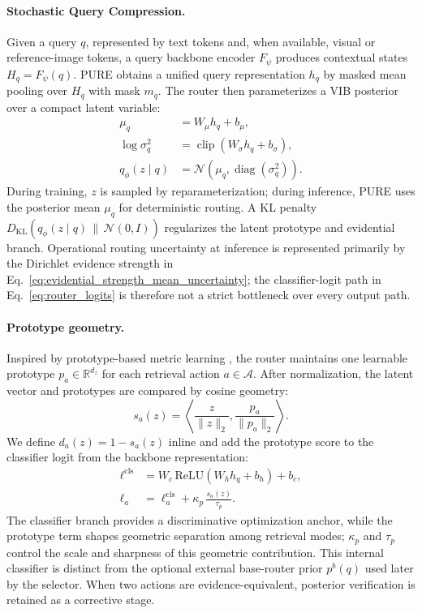 \documentclass[a4paper,fleqn]{cas-dc}
\begin{document}
\paragraph{Stochastic Query Compression.}
Given a query $q$, represented by text tokens and, when available, visual or reference-image tokens, a query backbone encoder $F_{\psi}$ produces contextual states $H_q=F_{\psi}(q)$. PURE obtains a unified query representation $h_q$ by masked mean pooling over $H_q$ with mask $m_q$. The router then parameterizes a VIB posterior over a compact latent variable:
\begin{equation}
\label{eq:vib_encoder}
\begin{aligned}
\mu_q&=W_{\mu}h_q+b_{\mu},\\
\log\sigma_q^2&=\operatorname{clip}(W_{\sigma}h_q+b_{\sigma}),\\
q_{\phi}(z\mid q)&=\mathcal{N}(\mu_q,\operatorname{diag}(\sigma_q^2)).
\end{aligned}
\end{equation}
During training, $z$ is sampled by reparameterization; during inference, PURE uses the posterior mean $\mu_q$ for deterministic routing. A KL penalty $D_{\mathrm{KL}}(q_{\phi}(z\mid q)\,\|\,\mathcal{N}(0,I))$ regularizes the latent prototype and evidential branch. Operational routing uncertainty at inference is represented primarily by the Dirichlet evidence strength in Eq.~\eqref{eq:evidential_strength_mean_uncertainty}; the classifier-logit path in Eq.~\eqref{eq:router_logits} is therefore not a strict bottleneck over every output path.

\paragraph{Prototype geometry.}
Inspired by prototype-based metric learning \citep{Snell2017Prototypical}, the router maintains one learnable prototype $p_a\in\mathbb{R}^{d_z}$ for each retrieval action $a\in\mathcal{A}$. After normalization, the latent vector and prototypes are compared by cosine geometry:
\begin{equation}
\label{eq:prototype_geometry}
s_a(z)=
\left\langle
\frac{z}{\|z\|_2},
\frac{p_a}{\|p_a\|_2}
\right\rangle.
\end{equation}
We define $d_a(z)=1-s_a(z)$ inline and add the prototype score to the classifier logit from the backbone representation:
\begin{equation}
\label{eq:router_logits}
\begin{aligned}
\boldsymbol{\ell}^{\mathrm{cls}}
&= W_c\,\mathrm{ReLU}(W_h h_q+b_h)+b_c,\\
\ell_a
&= \ell^{\mathrm{cls}}_a+\kappa_p\,\frac{s_a(z)}{\tau_p}.
\end{aligned}
\end{equation}
The classifier branch provides a discriminative optimization anchor, while the prototype term shapes geometric separation among retrieval modes; $\kappa_p$ and $\tau_p$ control the scale and sharpness of this geometric contribution. This internal classifier is distinct from the optional external base-router prior $p^b(q)$ used later by the selector. When two actions are evidence-equivalent, posterior verification is retained as a corrective stage.
\end{document}
